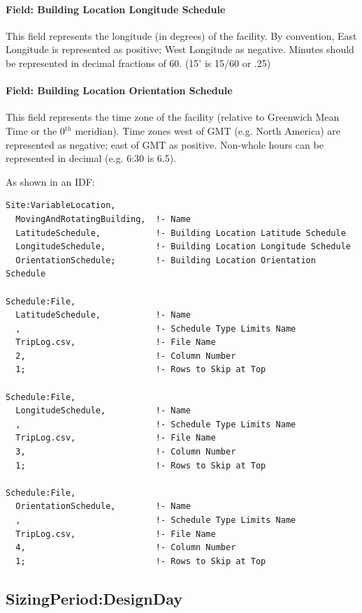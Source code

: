 \paragraph{Field: Building Location Longitude Schedule}\label{field-building-location-longitude-schedule}

This field represents the longitude (in degrees) of the facility. By convention, East Longitude is represented as positive; West Longitude as negative. Minutes should be represented in decimal fractions of 60. (15' is 15/60 or .25)

\paragraph{Field: Building Location Orientation Schedule}\label{field-building-location-orientation-schedule}

This field represents the time zone of the facility (relative to Greenwich Mean Time or the 0\(^{th}\) meridian). Time zones west of GMT (e.g. North America) are represented as negative; east of GMT as positive. Non-whole hours can be represented in decimal (e.g. 6:30 is 6.5).

As shown in an IDF:

\begin{lstlisting}
Site:VariableLocation,
  MovingAndRotatingBuilding,  !- Name
  LatitudeSchedule,           !- Building Location Latitude Schedule
  LongitudeSchedule,          !- Building Location Longitude Schedule
  OrientationSchedule;        !- Building Location Orientation Schedule

Schedule:File,
  LatitudeSchedule,           !- Name
  ,                           !- Schedule Type Limits Name
  TripLog.csv,                !- File Name
  2,                          !- Column Number
  1;                          !- Rows to Skip at Top

Schedule:File,
  LongitudeSchedule,          !- Name
  ,                           !- Schedule Type Limits Name
  TripLog.csv,                !- File Name
  3,                          !- Column Number
  1;                          !- Rows to Skip at Top

Schedule:File,
  OrientationSchedule,        !- Name
  ,                           !- Schedule Type Limits Name
  TripLog.csv,                !- File Name
  4,                          !- Column Number
  1;                          !- Rows to Skip at Top
\end{lstlisting}

\subsection{SizingPeriod:DesignDay}\label{sizingperioddesignday}

